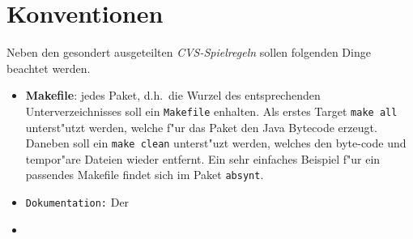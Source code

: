 


\section{Konventionen}
\label{sec:konventionen}

Neben den gesondert ausgeteilten \emph{CVS-Spielregeln} sollen folgenden
Dinge beachtet werden.

\begin{itemize}
\item \textbf{Makefile}: jedes Paket, d.h.\ die Wurzel des entsprechenden
  Unterverzeichnisses soll ein \texttt{Makefile} enhalten. Als erstes
  Target \texttt{make all} unterst"utzt werden, welche f"ur das Paket den
  Java Bytecode erzeugt. Daneben soll ein \texttt{make clean} unterst"uzt
  werden, welches den byte-code und tempor"are Dateien wieder entfernt. Ein
  sehr einfaches Beispiel f"ur ein passendes Makefile findet sich im Paket
  \texttt{absynt}. 
\item \texttt{Dokumentation:} Der 
\item 
\end{itemize}





